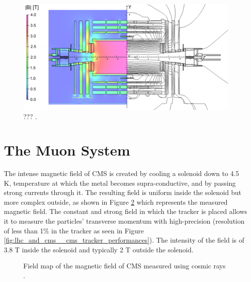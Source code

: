    \begin{figure}[h!]
      \centering
      \includegraphics[width=\textwidth]{img/I-3-cms/magnet.png}
      \caption{??? \cite{Chatrchyan:2009si}.}
      \label{fig:I-3-cms-magnet}
    \end{figure}


  \newcommand{\GeVc}{GeV c$ ^{-1} $}
  \newcommand{\um}{$ \mu $m}
  \newcommand{\us}{$ \mu $s}
  \newcommand{\pT}{$ p_T $}
  \newcommand{\pZ}{$ p_Z $}
  \newcommand{\axis}[1]{#1}



  \section{The Muon System}


  			The intense magnetic field of CMS is created by cooling a solenoid down to 4.5 K, temperature at which the metal becomes supra-conductive, and by passing strong currents through it. The resulting field is uniform inside the solenoid but more complex outside, as shown in Figure \ref{fig:lhc_and_cms__cms_magnetic_field} which represents the measured magnetic field. The constant and strong field in which the tracker is placed allows it to measure the particles' transverse momentum with high-precision (resolution of less than 1\% in the tracker as seen in Figure \ref{fig:lhc_and_cms__cms_tracker_performances}). The intensity of the field is of 3.8 T inside the solenoid and typically 2 T outside the solenoid. \\

  			\begin{figure}[h!]
  				\centering
  				\caption{Field map of the magnetic field of CMS measured using cosmic rays \Cite{CMS_B_Field}.}
  				\label{fig:lhc_and_cms__cms_magnetic_field}
  			\end{figure}

